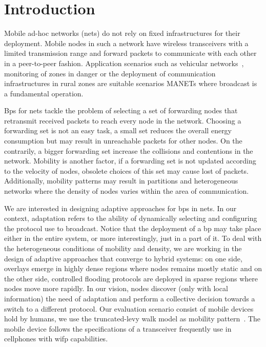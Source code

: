 \section{Introduction}
Mobile ad-hoc networks (\acs{nets}) do not rely on fixed infrastructures for their deployment.
%
Mobile nodes in such a network have wireless transceivers with a limited transmission range and forward packets to communicate with each other in a peer-to-peer fashion.
%
Application scenarios such as vehicular networks~\cite{Slavik2014a}, monitoring of zones in danger or the deployment of communication infrastructures in rural zones are suitable scenarios MANETs where broadcast is a fundamental operation.
%
%

\acl{Bps} for \acs{nets} tackle the problem of selecting a set of forwarding nodes that retransmit received packets to reach every node in the network.
%
Choosing a forwarding set is not an easy task, a small set reduces the overall energy consumption but may result in unreachable packets for other nodes.
%
On the contrarily, a bigger forwarding set increase the collisions and contentions in the network.
%
Mobility is another factor, if a forwarding set is not updated according to the velocity of nodes, obsolete choices of this set may cause lost of packets.
%
Additionally, mobility patterns may result in partitions and heterogeneous networks where the density of nodes varies within the area of communication.

We are interested in designing adaptive approaches for \acl{bps} in \acs{nets}.
%
In our context, adaptation refers to the ability of dynamically selecting and configuring the protocol use to broadcast.
%
Notice that the deployment of a \acl{bp} may take place either in the entire system, or more interestingly, just in a part of it.
%
To deal with the heterogeneous conditions of mobility and density, we are working in the design of adaptive approaches that converge to hybrid systems: on one side, overlays emerge in highly dense regions where nodes remains mostly static and on the other side, controlled flooding protocols are deployed in sparse regions where nodes move more rapidly.
%
In our vision, nodes discover (only with local information) the need of adaptation and perform a collective decision towards a switch to a different protocol.
%
Our evaluation scenario consist of mobile devices hold by humans, we use the truncated-levy walk model as mobility pattern~\cite{Rhee:2011}.
%
The mobile device follows the specifications of a transceiver frequently use in cellphones with \acl{wifp} capabilities.
%
